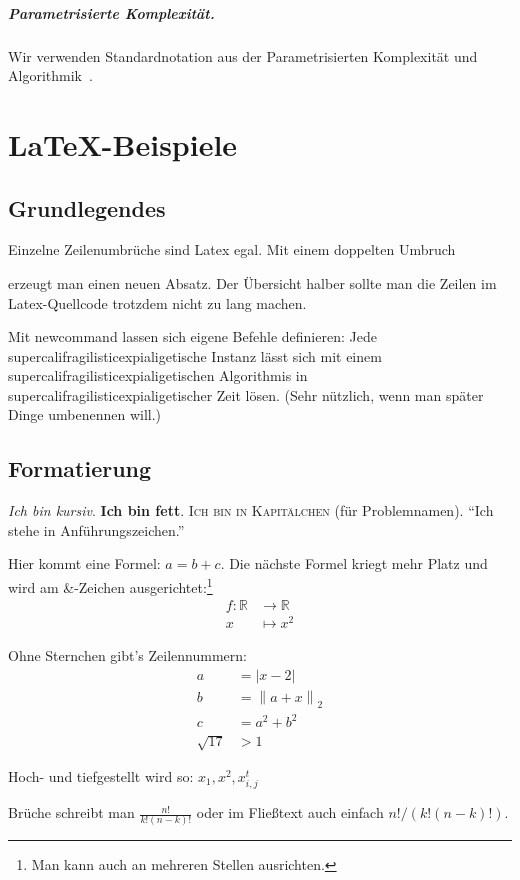 \documentclass[a4paper,titlepage,twocolumn,oneside,12pt,ngerman,titlepage=firstiscover]{scrbook}
\theoremstyle{plain} %
\theoremstyle{definition} %
\theoremstyle{remark} %
\theoremstyle{plain}
\newcommand{\RR}{\mathbb{R}} %
\newcommand\abs[1]{\left|#1\right|} %
\newcommand\norm[2]{\left\lVert#1\right\rVert_{#2}} %
\newcommand\enorm[1]{\norm{#1}{2}} %
\begin{document}
\paragraph*{Parametrisierte Komplexität.} 
Wir verwenden Standardnotation aus der Parametrisierten Komplexität und Algorithmik~\cite{Nie06}.

\chapter{\LaTeX{}-Beispiele}

\section{Grundlegendes}
Einzelne Zeilenumbrüche
sind 
Latex egal.
Mit einem doppelten Umbruch

erzeugt man einen neuen Absatz.
Der Übersicht halber sollte man die Zeilen im Latex-Quellcode trotzdem nicht zu lang machen.

Mit newcommand lassen sich eigene Befehle definieren:
\newcommand{\sfe}{supercalifragilisticexpialigetisch}
Jede \sfe{}e Instanz lässt sich mit einem \sfe{}en Algorithmis in \sfe{}er Zeit lösen.
(Sehr nützlich, wenn man später Dinge umbenennen will.)

\section{Formatierung}
\textit{Ich bin kursiv}.
\textbf{Ich bin fett}.
\textsc{Ich bin in Kapitälchen} (für Problemnamen).
\enquote{Ich stehe in Anführungszeichen.}

Hier kommt eine Formel: $a = b + c$.
Die nächste Formel kriegt mehr Platz und wird am \&-Zeichen ausgerichtet:\footnote{Man kann auch an mehreren Stellen ausrichten.}
\begin{align*}
f : \RR &\to \RR \\
x &\mapsto x^2
\end{align*}

Ohne Sternchen gibt's Zeilennummern:
\begin{align}
a &= \abs{x - 2}\\
b &= \enorm{a + x}\\
c &= a^2 + b^2 \\
\sqrt{17} &> 1 \label{eq:wurzel}
\end{align}

Hoch- und tiefgestellt wird so: $x_1, x^2, x_{i,j}^t$

Brüche schreibt man $\frac{n!}{k!(n-k)!}$ oder im Fließtext auch einfach $n!/(k!(n-k)!)$.
\end{document}
